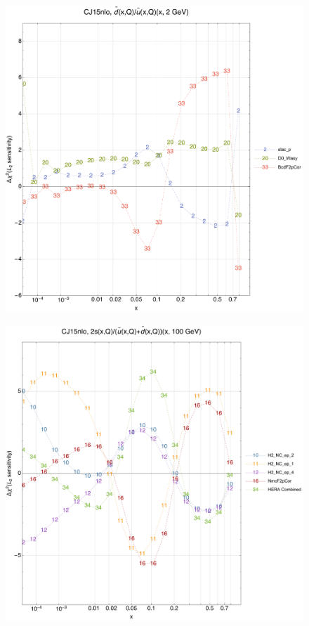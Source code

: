 \documentclass[10pt,aps,prd,floatfix,titlepage]{revtex4}
\begin{document}
\begin{figure}
\includegraphics[width=\textwidth,height=0.44\textheight,keepaspectratio]{2/rat_ifl4_CJ15nlo_L2_q2_Sf_2.pdf}
\caption{}
\end{figure}
\clearpage
\begin{figure}
\includegraphics[width=\textwidth,height=0.44\textheight,keepaspectratio]{2/rat_ifl5_CJ15nlo_L2_q100_Sf_2.pdf}
\caption{}
\end{figure}
\end{document}
